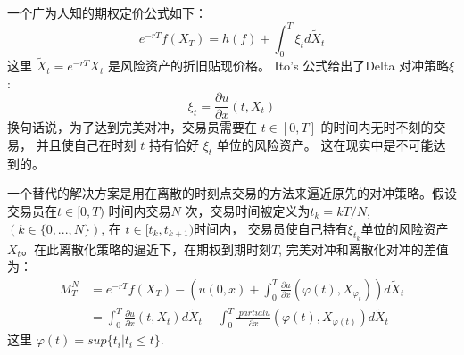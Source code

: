 一个广为人知的期权定价公式如下：
\begin{equation}
e^{-rT}f(X_T)=h(f)+\int_0^T \xi_t d\widetilde{X}_t
\end{equation}
这里 $\widetilde{X}_t=e^{-rT}X_t$ 是风险资产的折旧贴现价格。 
Ito's 公式给出了Delta 对冲策略$\xi$: 
\begin{equation}
\xi_t=\frac{\partial u}{\partial x}(t, X_t)
\end{equation}
换句话说，为了达到完美对冲，交易员需要在 
$t\in [0, T]$ 的时间内无时不刻的交易， 并且使自己在时刻 $t$ 持有恰好 $\xi_t$ 单位的风险资产。 
这在现实中是不可能达到的。

一个替代的解决方案是用在离散的时刻点交易的方法来逼近原先的对冲策略。假设交易员在$t\in[0, T)$
时间内交易$N$ 次，交易时间被定义为$t_k=kT/N$, $(k\in \{0,...,N\})$, 在 $t\in [t_k, t_{k+1})$时间内，
交易员使自己持有$\xi_{t_k}$单位的风险资产$X_t$。在此离散化策略的逼近下，在期权到期时刻$T$, 
完美对冲和离散化对冲的差值为：
\begin{equation}
\begin{split}
M_T^N
&=e^{-rT}f(X_T)-(u(0,x)+\int_0^T\frac{\partial u}{\partial x}(\varphi(t), 
X_{\varphi_t}))d\widetilde{X}_t\\
&=\int_0^T\frac{\partial u}{\partial x}(t, X_t)d\widetilde{X}_t-\int_0^T\frac{\    partial u}{\partial x}(\varphi(t), X_{\varphi(t)})d\widetilde{X}_t
\end{split}
\end{equation}
这里 $\varphi(t)=sup\{t_i | t_i\leq t \}$.


